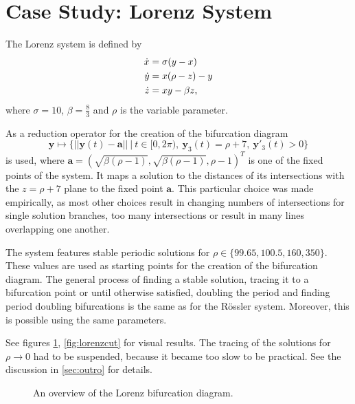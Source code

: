 \section{Case Study: Lorenz System}

The Lorenz system is defined by
\begin{align*}
	\dot x &= \sigma (y-x)\\
	\dot y &= x(\rho-z)-y\\
	\dot z &= xy-\beta z \text,
\end{align*}
where $\sigma = 10$, $\beta = \frac 8 3$ and $\rho$ is the variable parameter.

As a reduction operator for the creation of the bifurcation diagram
\[
	\mathbf y \mapsto \{||\mathbf y(t) - \mathbf a||\ |\ t \in [0,2\pi),\ \mathbf y_3(t) = \rho + 7, \ \mathbf y'_3(t) > 0\}
\]
is used, where $\mathbf a = (\sqrt{\beta(\rho-1)}, \sqrt{\beta(\rho-1)}, \rho-1)^T$ is one of the fixed points of the system.
It maps a solution to the distances of its intersections with the $z = \rho+7$ plane to the fixed point $\mathbf a$.
This particular choice was made empirically, as most other choices result in changing numbers of intersections for single solution branches, too many intersections or result in many lines overlapping one another.

The system features stable periodic solutions for $\rho \in \{99.65, 100.5, 160, 350\}$.
These values are used as starting points for the creation of the bifurcation diagram.
The general process of finding a stable solution, tracing it to a bifurcation point or until otherwise satisfied, doubling the period and finding period doubling bifurcations is the same as for the Rössler system.
Moreover, this is possible using the same parameters.

See figures \ref{fig:lorenzfull}, \ref{fig:lorenzcut} for visual results.
The tracing of the solutions for $\rho \to 0$ had to be suspended, because it became too slow to be practical.
See the discussion in \autoref{sec:outro} for details.


\begin{figure}
\centering{}
\caption{
	An overview of the Lorenz bifurcation diagram.
}
\label{fig:lorenzfull}
\end{figure}


